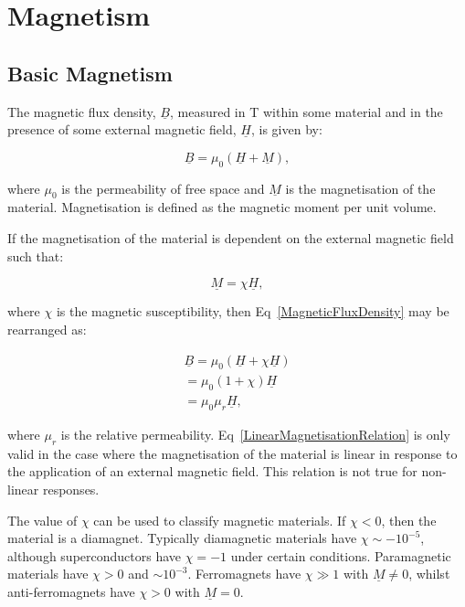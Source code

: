 \chapter{Magnetism}
\label{chapt1}

\section{Basic Magnetism}

The magnetic flux density, $\underline{B}$, measured in T within some material and in the presence of some external magnetic field, $\underline{H}$, is given by:

\begin{equation}
    \underline{B} = \mu_0 (\underline{H} + \underline{M}),
    \label{MagneticFluxDensity}
\end{equation}

\noindent where $\mu_0$ is the permeability of free space and $\underline{M}$ is the magnetisation of the material. Magnetisation is defined as the magnetic moment per unit volume.

\noindent If the magnetisation of the material is dependent on the external magnetic field such that:

\begin{equation}
    \underline{M} = \chi \underline{H},
    \label{LinearMagnetisationRelation}
\end{equation}

\noindent where $\chi$ is the magnetic susceptibility, then Eq~\ref{MagneticFluxDensity} may be rearranged as:

\begin{eqnarray}
    \underline{B} = \mu_0 (\underline{H} + \chi \underline{H}) \\
                  = \mu_0 (1 + \chi) \underline{H} \\
                  = \mu_0 \mu_r \underline{H}, \label{MagneticFluxDensityRelative}
\end{eqnarray}

\noindent where $\mu_r$ is the relative permeability. Eq~\ref{LinearMagnetisationRelation} is only valid in the case where the magnetisation of the material is linear in response to the application of an external magnetic field. This relation is not true for non-linear responses.

\noindent The value of $\chi$ can be used to classify magnetic materials. If $\chi < 0$, then the material is a diamagnet. Typically diamagnetic materials have $\chi \sim -10^{-5}$, although superconductors have $\chi = -1$ under certain conditions. Paramagnetic materials have $\chi > 0$ and $\sim 10^{-3}$. Ferromagnets have $\chi \gg 1$ with $\underline{M} \neq 0$, whilst anti-ferromagnets have $\chi > 0$ with $\underline{M} = 0$.

